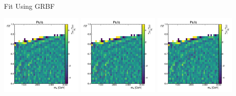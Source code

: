 \documentclass[10pt]{beamer}
\begin{document}
\begin{frame}{Fit Using GRBF}
  \begin{center}
    \includegraphics[width=0.3\textwidth]{figures/2dpullplots/grbf/E_1500_0p5_100_0p05.pdf} 
    \includegraphics[width=0.3\textwidth]{figures/2dpullplots/grbf/E_1500_0p5_150_0p05.pdf} 
    \includegraphics[width=0.3\textwidth]{figures/2dpullplots/grbf/E_2000_0p7_150_0p05.pdf} 

\end{center}
\end{frame}
\end{document}
